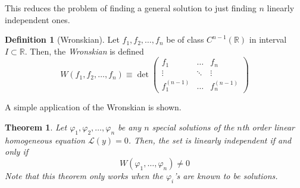 \documentclass{article}
\newtheorem{theorem}{Theorem}[section]
\theoremstyle{remark}
\theoremstyle{definition}
\newtheorem{definition}{Definition}[section]
\begin{document}
This reduces the problem of finding a general solution to just finding $n$ linearly independent ones. 

\begin{definition}[Wronskian]
Let $f_1, f_2, \ldots, f_n$ be of class $C^{n-1} (\mathbb{R})$ in interval $I \subset \mathbb{R}$. Then, the \textit{Wronskian} is defined
\[W(f_1, f_2, \ldots, f_n) \equiv \det{\begin{pmatrix}
f_1&\ldots&f_n\\
\vdots&\ddots&\vdots\\
f_1^{(n-1)}&\ldots&f_n^{(n-1)}
\end{pmatrix}}\]
\end{definition}

A simple application of the Wronskian is shown. 
\begin{theorem}
Let $\varphi_1, \varphi_2, \ldots, \varphi_n$ be any $n$ special solutions of the $n$th order linear homogeneous equation $\mathcal{L}(y) = 0$. Then, the set is linearly independent if and only if 
\[W(\varphi_1, \ldots, \varphi_n) \neq 0\]
Note that this theorem only works when the $\varphi_i$'s are known to be solutions. 
\end{theorem}
\end{document}

